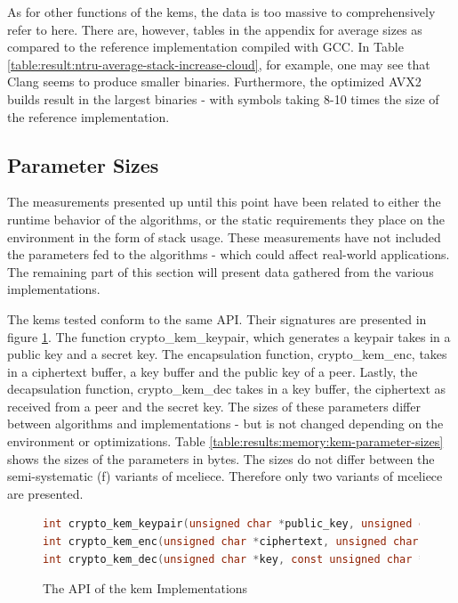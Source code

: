 As for other functions of the \glspl{kem}, the data is too massive to comprehensively refer to here. There are, however, tables in the appendix for average sizes as compared to the reference implementation compiled with GCC. In Table \ref{table:result:ntru-average-stack-increase-cloud}, for example, one may see that Clang seems to produce smaller binaries. Furthermore, the optimized AVX2 builds result in the largest binaries - with symbols taking 8-10 times the size of the reference implementation.


\subsection{Parameter Sizes}

The measurements presented up until this point have been related to either the runtime behavior of the algorithms, or the static requirements they place on the environment in the form of stack usage. These measurements have not included the parameters fed to the algorithms - which could affect real-world applications. The remaining part of this section will present data gathered from the various implementations.

The \glspl{kem} tested conform to the same API. Their signatures are presented in figure \ref{figure:result:memory:kem-api}. The function crypto\_kem\_keypair, which generates a keypair takes in a public key and a secret key. The encapsulation function, crypto\_kem\_enc, takes in a ciphertext buffer, a key buffer and the public key of a peer. Lastly, the decapsulation function, crypto\_kem\_dec takes in a key buffer, the ciphertext as received from a peer and the secret key. The sizes of these parameters differ between algorithms and implementations - but is not changed depending on the environment or optimizations. Table \ref{table:results:memory:kem-parameter-sizes} shows the sizes of the parameters in bytes. The sizes do not differ between the semi-systematic (f) variants of \gls{mceliece}. Therefore only two variants of \gls{mceliece} are presented.

\begin{figure}
    \centering
    \begin{lstlisting}[language=C]
int crypto_kem_keypair(unsigned char *public_key, unsigned char *private_key);
int crypto_kem_enc(unsigned char *ciphertext, unsigned char *key, const unsigned char *public_key);
int crypto_kem_dec(unsigned char *key, const unsigned char *ciphertext, const unsigned char *private_key);
    \end{lstlisting}
    \caption{The API of the \gls{kem} Implementations}
    \label{figure:result:memory:kem-api}
\end{figure}

